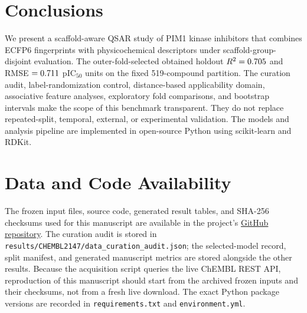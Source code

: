 \documentclass[11pt]{article}
\begin{document}
\section{Conclusions}

We present a scaffold-aware QSAR study of PIM1 kinase inhibitors that combines
ECFP6 fingerprints with physicochemical descriptors under scaffold-group-disjoint evaluation.
The outer-fold-selected \SelectedModel{} obtained holdout $R^2 = 0.705{}$
and RMSE $= 0.711{}$ pIC$_{50}$ units on the fixed 519-compound partition.
The curation audit, label-randomization control, distance-based applicability domain,
associative feature analyses, exploratory fold comparisons, and bootstrap intervals make the
scope of this benchmark transparent. They do not replace repeated-split, temporal, external,
or experimental validation. The models and analysis pipeline are implemented in open-source
Python using scikit-learn and RDKit.

\section*{Data and Code Availability}

The frozen input files, source code, generated result tables, and SHA-256 checksums used
for this manuscript are available in the project's
\href{https://github.com/MikeZenko/Scaffold-Aware-QSAR-Modeling-PIM1}{GitHub repository}. The curation audit is
stored in \texttt{results/CHEMBL2147/data\_curation\_audit.json}; the selected-model record,
split manifest, and generated manuscript metrics are stored alongside the other results.
Because the acquisition script queries the live ChEMBL REST API, reproduction of this manuscript
should start from the archived frozen inputs and their checksums, not from a fresh live download.
The exact Python package versions are recorded in \texttt{requirements.txt} and
\texttt{environment.yml}.
\end{document}
